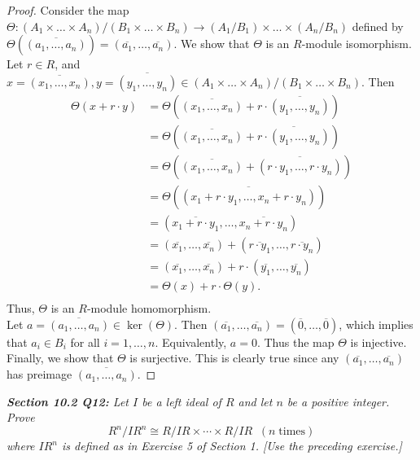 \documentclass{article}
\begin{document}
  \begin{proof}
    Consider the map $\Theta:(A_1\times\ldots\times
    A_n)/(B_1\times\ldots\times B_n)
    \rightarrow(A_1/B_1)\times\ldots\times(A_n/B_n)$ defined by
    $\Theta(\overline{(a_1,\ldots,a_n)})
    =(\overline{a_1},\ldots,\overline{a_n})$. We show that $\Theta$ is an
    $R$-module isomorphism. \\

    Let $r\in R$, and $x=\overline{(x_1,\ldots,x_n)},
    y=\overline{(y_1,\ldots,y_n)}\in (A_1\times\ldots\times
    A_n)/(B_1\times\ldots\times B_n)$. Then
    \begin{align*}
      \Theta(x+r\cdot y) &=\Theta(\overline{(x_1,\ldots,x_n)}
        +r\cdot\overline{(y_1,\ldots,y_n)}) \\
      &=\Theta(\overline{(x_1,\ldots,x_n)}
        +\overline{r\cdot(y_1,\ldots,y_n)}) \\
      &=\Theta(\overline{(x_1,\ldots,x_n)}
        +\overline{(r\cdot y_1,\ldots,r\cdot y_n)}) \\
      &=\Theta(\overline{(x_1+r\cdot y_1,\ldots,x_n+r\cdot y_n)}) \\
      &=(\overline{x_1+r\cdot y_1},\ldots,\overline{x_n+r\cdot y_n}) \\
      &=(\overline{x_1},\ldots,\overline{x_n})
        +(\overline{r\cdot y_1},\ldots,\overline{r\cdot y_n}) \\
      &=(\overline{x_1},\ldots,\overline{x_n})
        +r\cdot(\overline{y_1},\ldots,\overline{y_n}) \\
      &=\Theta(x)+r\cdot\Theta(y). \\
    \end{align*}
    Thus, $\Theta$ is an $R$-module homomorphism. \\

    Let $a=\overline{(a_1,\ldots,a_n)}\in\ker(\Theta)$. Then
    $(\overline{a_1},\ldots,\overline{a_n})
    =(\overline{0},\ldots,\overline{0})$, which implies that $a_i\in B_i$
    for all $i=1,\ldots,n$. Equivalently, $a=0$. Thus the map $\Theta$ is
    injective. \\

    Finally, we show that $\Theta$ is surjective. This is clearly true
    since any $(\overline{a_1},\ldots,\overline{a_n})$ has preimage
    $\overline{(a_1,\ldots,a_n)}$.
  \end{proof}

\it \textbf{Section 10.2 Q12:} Let $I$ be a left ideal of $R$ and let $n$
  be a positive integer. Prove
  \[R^n/IR^n \cong R/IR\times\cdots\times R/IR\;\; (n\; \text{times})\]
  where $IR^n$ is defined as in Exercise 5 of Section 1. [Use the preceding
  exercise.]
\end{document}
